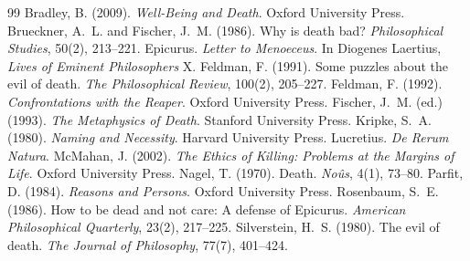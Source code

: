 \documentclass{situationist-preprint}
\begin{document}
\begin{thebibliography}{99}\small
{} Bradley, B. (2009). \emph{Well-Being and Death}. Oxford University Press.
 Brueckner, A.~L. and Fischer, J.~M. (1986). Why is death bad? \emph{Philosophical Studies}, 50(2), 213--221.
 Epicurus. \emph{Letter to Menoeceus}. In Diogenes Laertius, \emph{Lives of Eminent Philosophers} X.
 Feldman, F. (1991). Some puzzles about the evil of death. \emph{The Philosophical Review}, 100(2), 205--227.
 Feldman, F. (1992). \emph{Confrontations with the Reaper}. Oxford University Press.
 Fischer, J.~M. (ed.) (1993). \emph{The Metaphysics of Death}. Stanford University Press.
 Kripke, S.~A. (1980). \emph{Naming and Necessity}. Harvard University Press.
 Lucretius. \emph{De Rerum Natura}.
 McMahan, J. (2002). \emph{The Ethics of Killing: Problems at the Margins of Life}. Oxford University Press.
 Nagel, T. (1970). Death. \emph{No\^us}, 4(1), 73--80.
 Parfit, D. (1984). \emph{Reasons and Persons}. Oxford University Press.
 Rosenbaum, S.~E. (1986). How to be dead and not care: A defense of Epicurus. \emph{American Philosophical Quarterly}, 23(2), 217--225.
 Silverstein, H.~S. (1980). The evil of death. \emph{The Journal of Philosophy}, 77(7), 401--424.
\end{thebibliography}
\end{document}
